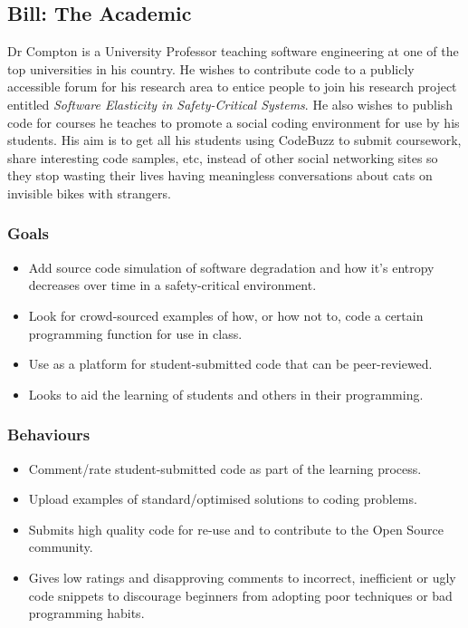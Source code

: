 \documentclass[11pt,a4paper]{article}
\begin{document}
\newpage

\subsection{Bill: The Academic}

Dr Compton is a University Professor teaching software engineering at
one of the top universities in his country. He wishes to contribute
code to a publicly accessible forum for his research area to entice
people to join his research project entitled
\textit{Software Elasticity in Safety-Critical Systems}. He also wishes
to publish code for courses he teaches to promote a social coding
environment for use by his students. His aim is to get all his students
using CodeBuzz to submit coursework, share interesting code samples,
etc, instead of other social networking sites so they stop
wasting their lives having meaningless conversations about cats on
invisible bikes with strangers.

\subsubsection{Goals}

\begin{itemize}
\item Add source code simulation of software degradation and how it's
entropy decreases over time in a safety-critical environment.
\item Look for crowd-sourced examples of how, or how not to, code a certain
programming function for use in class.
\item Use as a platform for student-submitted code that can be peer-reviewed.
\item Looks to aid the learning of students and others in their programming.
\end{itemize}

\subsubsection{Behaviours}

\begin{itemize}
\item Comment/rate student-submitted code as part of the learning process.
\item Upload examples of standard/optimised solutions to coding problems.
\item Submits high quality code for re-use and to contribute to the Open
Source community.
\item Gives low ratings and disapproving comments to incorrect,
inefficient or ugly code snippets to discourage beginners from
adopting poor techniques or bad programming habits.
\end{itemize}
\end{document}
